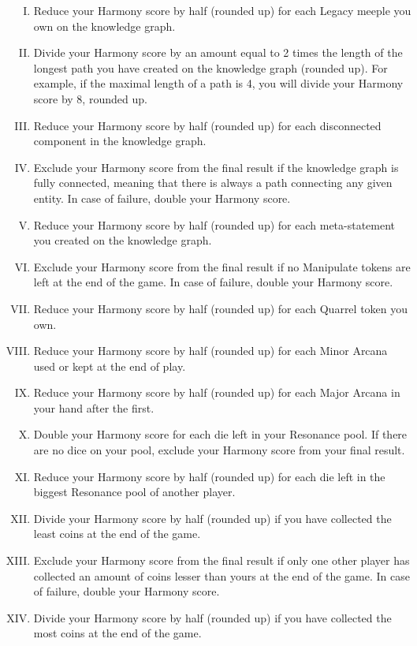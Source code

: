\documentclass{article}
\begin{document}
\begin{multicols}{2}
\begin{enumerate}[I.]
\item Reduce your Harmony score by half (rounded up) for each Legacy meeple you own on the knowledge graph.
\item Divide your Harmony score by an amount equal to 2 times the length of the longest path you have created on the knowledge graph (rounded up). For example, if the maximal length of a path is 4, you will divide your Harmony score by 8, rounded up.
\item Reduce your Harmony score by half (rounded up) for each disconnected component in the knowledge graph.
\item Exclude your Harmony score from the final result if the knowledge graph is fully connected, meaning that there is always a path connecting any given entity. In case of failure, double your Harmony score.
\item Reduce your Harmony score by half (rounded up) for each meta-statement you created on the knowledge graph.
\item Exclude your Harmony score from the final result if no Manipulate tokens are left at the end of the game. In case of failure, double your Harmony score.
\item Reduce your Harmony score by half (rounded up) for each Quarrel token you own.
\item Reduce your Harmony score by half (rounded up) for each Minor Arcana used or kept at the end of play.
\item Reduce your Harmony score by half (rounded up) for each Major Arcana in your hand after the first.
\item Double your Harmony score for each die left in your Resonance pool. If there are no dice on your pool, exclude your Harmony score from your final result.
\item Reduce your Harmony score by half (rounded up) for each die left in the biggest Resonance pool of another player.
\item Divide your Harmony score by half (rounded up) if you have collected the least coins at the end of the game.
\item Exclude your Harmony score from the final result if only one other player has collected an amount of coins lesser than yours at the end of the game. In case of failure, double your Harmony score.
\item Divide your Harmony score by half (rounded up) if you have collected the most coins at the end of the game.

\end{enumerate}
\end{multicols}
\end{document}
